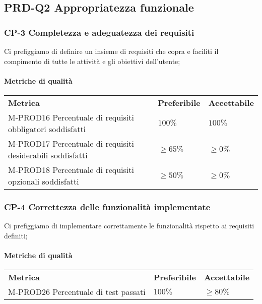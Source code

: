     \subsection{PRD-Q2 Appropriatezza funzionale}
        \subsubsection{CP-3 Completezza e adeguatezza dei requisiti}
        	Ci prefiggiamo di definire un insieme di requisiti che copra e faciliti il compimento di tutte le attività e gli obiettivi dell'utente;
        \paragraph{Metriche di qualità}
        \begin{longtable} {
        		>{}p{80mm} 
        		>{}p{25mm}
        		>{}p{25mm}
        	}
        	\rowcolor{gray!50}
        	\textbf{Metrica} & \textbf{Preferibile} & \textbf{Accettabile} \TBstrut \TBstrut \\
        	M-PROD16 Percentuale di requisiti obbligatori soddisfatti & $100\%$ & $100\%$ \TBstrut \\ [2mm]
        	M-PROD17 Percentuale di requisiti desiderabili soddisfatti & $\ge65\%$ & $\ge0\%$ \TBstrut \\ [2mm]
        	M-PROD18 Percentuale di requisiti opzionali soddisfatti & $\ge50\%$ & $\ge0\%$ \TBstrut \\ [2mm]
        \end{longtable}
    \subsubsection{CP-4 Correttezza delle funzionalità implementate}
    	Ci prefiggiamo di implementare correttamente le funzionalità rispetto ai requisiti definiti;
    	\paragraph{Metriche di qualità}
    	\begin{longtable} {
    			>{}p{80mm} 
    			>{}p{25mm}
    			>{}p{25mm}
    		}
    		\rowcolor{gray!50}
    		\textbf{Metrica} & \textbf{Preferibile} & \textbf{Accettabile} \TBstrut \TBstrut \\
    		M-PROD26 Percentuale di test passati & $100\%$ & $\ge 80\%$ \TBstrut \\ [2mm]
    	\end{longtable}
            

